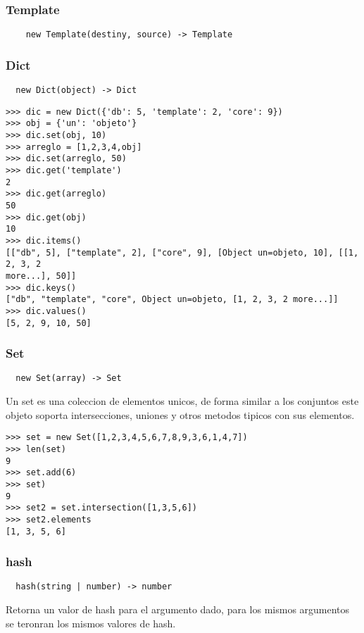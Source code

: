 \begin{lstlisting}[style=consola]
\end{lstlisting}

\subsubsection*{Template}
\begin{verbatim}
    new Template(destiny, source) -> Template
\end{verbatim}

\subsubsection*{Dict}
\begin{verbatim}
  new Dict(object) -> Dict
\end{verbatim}
\begin{lstlisting}[style=consola]
>>> dic = new Dict({'db': 5, 'template': 2, 'core': 9})
>>> obj = {'un': 'objeto'}
>>> dic.set(obj, 10)
>>> arreglo = [1,2,3,4,obj]
>>> dic.set(arreglo, 50)
>>> dic.get('template')
2
>>> dic.get(arreglo)
50
>>> dic.get(obj)
10
>>> dic.items()
[["db", 5], ["template", 2], ["core", 9], [Object un=objeto, 10], [[1, 2, 3, 2
more...], 50]]
>>> dic.keys()
["db", "template", "core", Object un=objeto, [1, 2, 3, 2 more...]]
>>> dic.values()
[5, 2, 9, 10, 50]
\end{lstlisting}

\subsubsection*{Set}
\begin{verbatim}
  new Set(array) -> Set
\end{verbatim}
Un set es una coleccion de elementos unicos, de forma similar a los conjuntos este objeto soporta intersecciones, uniones y otros metodos tipicos con sus elementos.
\begin{lstlisting}[style=consola]
>>> set = new Set([1,2,3,4,5,6,7,8,9,3,6,1,4,7])
>>> len(set)
9
>>> set.add(6)
>>> set)
9
>>> set2 = set.intersection([1,3,5,6])
>>> set2.elements
[1, 3, 5, 6]
\end{lstlisting}

\subsubsection*{hash}
\begin{verbatim}
  hash(string | number) -> number
\end{verbatim}
Retorna un valor de hash para el argumento dado, para los mismos argumentos se
teronran los mismos valores de hash.

